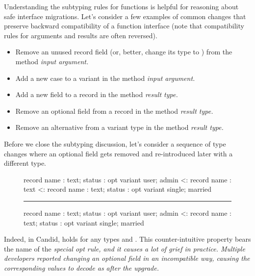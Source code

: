\documentclass{article}
\begin{document}
Understanding the subtyping rules for functions is helpful for reasoning about safe interface migrations.
Let's consider a few examples of common changes that preserve backward compatibility of a function interface (note that compatibility rules for arguments and results are often reversed).

\begin{itemize}
    \item
    Remove an unused record field (or, better, change its type to ) from the method \em{input} argument.
    \item
    Add a new case to a variant in the method \em{input} argument.
    \item
    Add a new field to a record in the method \em{result} type.
    \item
    Remove an optional field from a record in the method \em{result} type.
    \item
    Remove an alternative from a variant type in the method \em{result} type.
\end{itemize}

Before we close the subtyping discussion, let's consider a sequence of type changes where an optional field gets removed and re-introduced later with a different type.

\begin{figure}
\begin{code}[candid]
   record { name : text; status : opt variant { user;   admin   } }
<: record { name : text } 
<: record { name : text; status : opt variant { single; married } } 
\hrule    record { name : text; status : opt variant { user;   admin   } }
<: record { name : text; status : opt variant { single; married } }
\end{code}
\end{figure}

Indeed, in Candid,  holds for any types  and .
This counter-intuitive property bears the name of the \em{special opt rule}, and it causes a lot of grief in practice.
Multiple developers reported changing an optional field in an incompatible way, causing the corresponding values to decode as  after the upgrade.
\end{document}
